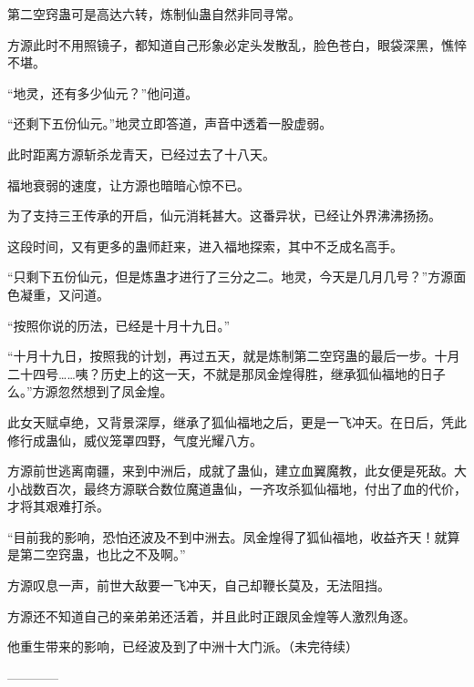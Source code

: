 \begin{this_body}
第二空窍蛊可是高达六转，炼制仙蛊自然非同寻常。

方源此时不用照镜子，都知道自己形象必定头发散乱，脸色苍白，眼袋深黑，憔悴不堪。

“地灵，还有多少仙元？”他问道。

“还剩下五份仙元。”地灵立即答道，声音中透着一股虚弱。

此时距离方源斩杀龙青天，已经过去了十八天。

福地衰弱的速度，让方源也暗暗心惊不已。

为了支持三王传承的开启，仙元消耗甚大。这番异状，已经让外界沸沸扬扬。

这段时间，又有更多的蛊师赶来，进入福地探索，其中不乏成名高手。

“只剩下五份仙元，但是炼蛊才进行了三分之二。地灵，今天是几月几号？”方源面色凝重，又问道。

“按照你说的历法，已经是十月十九日。”

“十月十九日，按照我的计划，再过五天，就是炼制第二空窍蛊的最后一步。十月二十四号……咦？历史上的这一天，不就是那凤金煌得胜，继承狐仙福地的日子么。”方源忽然想到了凤金煌。

此女天赋卓绝，又背景深厚，继承了狐仙福地之后，更是一飞冲天。在日后，凭此修行成蛊仙，威仪笼罩四野，气度光耀八方。

方源前世逃离南疆，来到中洲后，成就了蛊仙，建立血翼魔教，此女便是死敌。大小战数百次，最终方源联合数位魔道蛊仙，一齐攻杀狐仙福地，付出了血的代价，才将其艰难打杀。

“目前我的影响，恐怕还波及不到中洲去。凤金煌得了狐仙福地，收益齐天！就算是第二空窍蛊，也比之不及啊。”

方源叹息一声，前世大敌要一飞冲天，自己却鞭长莫及，无法阻挡。

方源还不知道自己的亲弟弟还活着，并且此时正跟凤金煌等人激烈角逐。

他重生带来的影响，已经波及到了中洲十大门派。（未完待续）

------------

\end{this_body}

